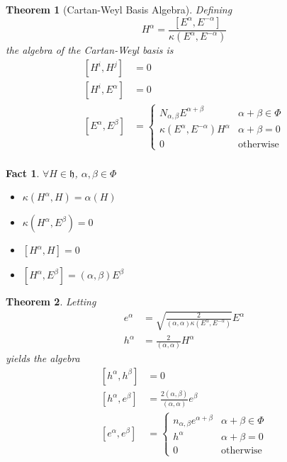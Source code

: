 \documentclass{article}
\newtheorem{theorem}{Theorem}[subsection]
\newtheorem{fact}{Fact}[subsection]
\newcommand{\mf}[1]{\mathfrak{#1}}
\newcommand{\comm}[2][]{\left[ #1, #2 \right]}
\begin{document}
\begin{theorem}[Cartan-Weyl Basis Algebra]
Defining 
\[
    H^\alpha = \frac{\comm[E^\alpha]{E^{-\alpha}}}{\kappa\left(E^\alpha,E^{-\alpha}\right)}
\]
the algebra of the Cartan-Weyl basis is 
\begin{align*}
    \comm[H^i]{H^j} &= 0 \\
    \comm[H^i]{E^\alpha} &= 0 \\
    \comm[E^\alpha]{E^\beta} &= \left\{ \begin{array}{lc} N_{\alpha,\beta}E^{\alpha+\beta} & \alpha+\beta\in\Phi \\
    \kappa\left(E^\alpha,E^{-\alpha}\right)H^\alpha & \alpha+\beta=0 \\
    0 & \text{otherwise}
    \end{array} \right. \\
\end{align*}
\end{theorem}

\begin{fact}
$\forall H\in\mf{h}$, $\alpha,\beta\in\Phi$
\begin{itemize}
    \item $\kappa\left(H^\alpha,H\right)=\alpha(H)$
    \item $\kappa\left(H^\alpha,E^\beta\right)=0$
    \item $\comm[H^\alpha]{H}=0$
    \item $\comm[H^\alpha]{E^\beta}=(\alpha,\beta)E^\beta$
\end{itemize}
\end{fact}

\begin{theorem}
Letting 
\begin{align*}
    e^\alpha &= \sqrt{\frac{2}{(\alpha,\alpha)\kappa\left(E^\alpha,E^{-\alpha}\right)}}E^\alpha \\
    h^\alpha &= \frac{2}{(\alpha,\alpha)}H^\alpha
\end{align*}
yields the algebra
\begin{align*}
    \comm[h^\alpha]{h^\beta} &= 0 \\
    \comm[h^\alpha]{e^\beta} &= \frac{2(\alpha,\beta)}{(\alpha,\alpha)}e^\beta \\
    \comm[e^\alpha]{e^\beta} &= \left\{ \begin{array}{lc} n_{\alpha,\beta}e^{\alpha+\beta} & \alpha+\beta\in\Phi \\
    h^\alpha & \alpha+\beta=0 \\
    0 & \text{otherwise}
    \end{array} \right.\\
\end{align*}
\end{theorem}
\end{document}
